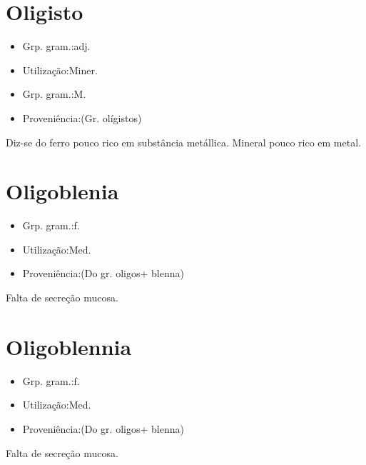 \section{Oligisto}
\begin{itemize}
\item {Grp. gram.:adj.}
\end{itemize}
\begin{itemize}
\item {Utilização:Miner.}
\end{itemize}
\begin{itemize}
\item {Grp. gram.:M.}
\end{itemize}
\begin{itemize}
\item {Proveniência:(Gr. \textunderscore olígistos\textunderscore )}
\end{itemize}
Diz-se do ferro pouco rico em substância metállica.
Mineral pouco rico em metal.
\section{Oligoblenia}
\begin{itemize}
\item {Grp. gram.:f.}
\end{itemize}
\begin{itemize}
\item {Utilização:Med.}
\end{itemize}
\begin{itemize}
\item {Proveniência:(Do gr. \textunderscore oligos\textunderscore  + \textunderscore blenna\textunderscore )}
\end{itemize}
Falta de secreção mucosa.
\section{Oligoblennia}
\begin{itemize}
\item {Grp. gram.:f.}
\end{itemize}
\begin{itemize}
\item {Utilização:Med.}
\end{itemize}
\begin{itemize}
\item {Proveniência:(Do gr. \textunderscore oligos\textunderscore  + \textunderscore blenna\textunderscore )}
\end{itemize}
Falta de secreção mucosa.
